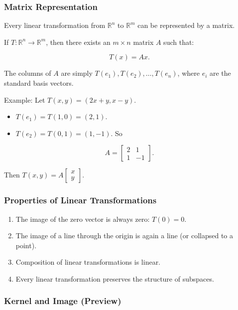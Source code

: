 \documentclass[
  letterpaper,
  DIV=11,
  numbers=noendperiod]{scrreprt}
\providecommand{\tightlist}{%
  \setlength{\itemsep}{0pt}\setlength{\parskip}{0pt}}
\begin{document}
\subsubsection{Matrix Representation}\label{matrix-representation}

Every linear transformation from \(\mathbb{R}^n\) to \(\mathbb{R}^m\)
can be represented by a matrix.

If \(T: \mathbb{R}^n \to \mathbb{R}^m\), then there exists an
\(m \times n\) matrix \(A\) such that:

\[
T(x) = Ax.
\]

The columns of \(A\) are simply \(T(e_1), T(e_2), \dots, T(e_n)\), where
\(e_i\) are the standard basis vectors.

Example: Let \(T(x,y) = (2x+y, x-y)\).

\begin{itemize}
\tightlist
\item
  \(T(e_1) = T(1,0) = (2,1)\).
\item
  \(T(e_2) = T(0,1) = (1,-1)\). So
\end{itemize}

\[
A = \begin{bmatrix} 2 & 1 \\ 1 & -1 \end{bmatrix}.
\]

Then \(T(x,y) = A \begin{bmatrix} x \\ y \end{bmatrix}\).

\subsubsection{Properties of Linear
Transformations}\label{properties-of-linear-transformations}

\begin{enumerate}
\def\labelenumi{\arabic{enumi}.}
\tightlist
\item
  The image of the zero vector is always zero: \(T(0) = 0\).
\item
  The image of a line through the origin is again a line (or collapsed
  to a point).
\item
  Composition of linear transformations is linear.
\item
  Every linear transformation preserves the structure of subspaces.
\end{enumerate}

\subsubsection{Kernel and Image
(Preview)}\label{kernel-and-image-preview}
\end{document}
